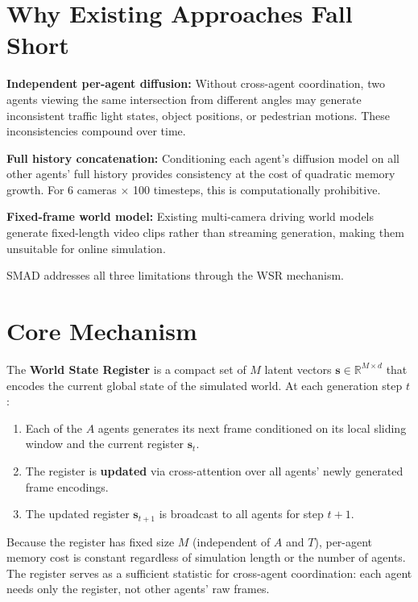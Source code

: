 \documentclass[10pt,twocolumn]{article}
\begin{document}
\section{Why Existing Approaches Fall Short}

\textbf{Independent per-agent diffusion:} Without cross-agent coordination,
two agents viewing the same intersection from different angles may
generate inconsistent traffic light states, object positions, or
pedestrian motions. These inconsistencies compound over time.

\textbf{Full history concatenation:} Conditioning each agent's
diffusion model on all other agents' full history provides consistency
at the cost of quadratic memory growth. For 6 cameras $\times$ 100
timesteps, this is computationally prohibitive.

\textbf{Fixed-frame world model:} Existing multi-camera driving world
models generate fixed-length video clips rather than streaming
generation, making them unsuitable for online simulation.

SMAD addresses all three limitations through the WSR mechanism.

\section{Core Mechanism}

The \textbf{World State Register} is a compact set of $M$ latent
vectors $\mathbf{s} \in \mathbb{R}^{M \times d}$ that encodes the
current global state of the simulated world. At each generation step $t$:

\begin{enumerate}[itemsep=2pt,parsep=0pt]
  \item Each of the $A$ agents generates its next frame conditioned on
    its local sliding window and the current register $\mathbf{s}_t$.
  \item The register is \textbf{updated} via cross-attention over all
    agents' newly generated frame encodings.
  \item The updated register $\mathbf{s}_{t+1}$ is broadcast to all
    agents for step $t+1$.
\end{enumerate}

Because the register has fixed size $M$ (independent of $A$ and $T$),
per-agent memory cost is constant regardless of simulation length or
the number of agents. The register serves as a sufficient statistic
for cross-agent coordination: each agent needs only the register,
not other agents' raw frames.
\end{document}
